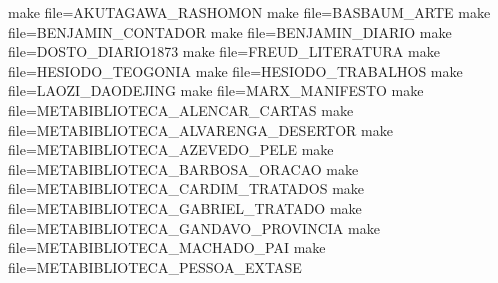 make file=AKUTAGAWA_RASHOMON
make file=BASBAUM_ARTE
make file=BENJAMIN_CONTADOR
make file=BENJAMIN_DIARIO
make file=DOSTO_DIARIO1873
make file=FREUD_LITERATURA
make file=HESIODO_TEOGONIA
make file=HESIODO_TRABALHOS
make file=LAOZI_DAODEJING
make file=MARX_MANIFESTO
make file=METABIBLIOTECA_ALENCAR_CARTAS
make file=METABIBLIOTECA_ALVARENGA_DESERTOR
make file=METABIBLIOTECA_AZEVEDO_PELE
make file=METABIBLIOTECA_BARBOSA_ORACAO
make file=METABIBLIOTECA_CARDIM_TRATADOS
make file=METABIBLIOTECA_GABRIEL_TRATADO
make file=METABIBLIOTECA_GANDAVO_PROVINCIA
make file=METABIBLIOTECA_MACHADO_PAI
make file=METABIBLIOTECA_PESSOA_EXTASE
